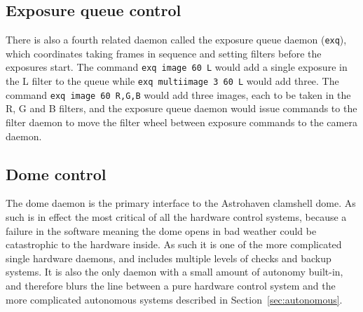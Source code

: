 \begin{colsection}
\begin{colsection}
\end{colsection}


\subsection{Exposure queue control}
\label{sec:exq}
\begin{colsection}

There is also a fourth related daemon called the exposure queue daemon (\texttt{exq}), which coordinates taking frames in sequence and setting filters before the exposures start. The command \texttt{exq~image~60~L} would add a single exposure in the L filter to the queue while \texttt{exq~multiimage~3~60~L} would add three. The command \texttt{exq~image~60~R,G,B} would add three images, each to be taken in the R, G and B filters, and the exposure queue daemon would issue commands to the filter daemon to move the filter wheel between exposure commands to the camera daemon.

\end{colsection}


\subsection{Dome control}
\label{sec:dome}
\begin{colsection}

The dome daemon is the primary interface to the Astrohaven clamshell dome. As such is in effect the most critical of all the hardware control systems, because a failure in the software meaning the dome opens in bad weather could be catastrophic to the hardware inside. As such it is one of the more complicated single hardware daemons, and includes multiple levels of checks and backup systems. It is also the only daemon with a small amount of autonomy built-in, and therefore blurs the line between a pure hardware control system and the more complicated autonomous systems described in Section~\ref{sec:autonomous}.


\end{colsection}
\end{colsection}
